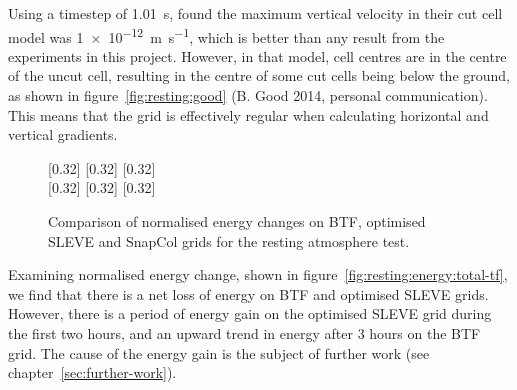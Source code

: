 Using a timestep of \SI{1.01}{\second}, \textcite{good2013} found the maximum vertical velocity in their cut cell model was \SI{1e-12}{\meter\per\second}, which is better than any result from the experiments in this project.  However, in that model, cell centres are in the centre of the uncut cell, resulting in the centre of some cut cells being below the ground, as shown in figure~\ref{fig:resting:good} (B. Good 2014, personal communication).  This means that the grid is effectively regular when calculating horizontal and vertical gradients.

\begin{figure}
	\captionsetup[subfigure]{position=b}
	\centering
	[0.32\textwidth]{}
	\hfill
	[0.32\textwidth]{}
	\hfill
	[0.32\textwidth]{}
	\\
	[0.32\textwidth]{}
	\hfill
	[0.32\textwidth]{}
	\hfill
	[0.32\textwidth]{}
	\caption{Comparison of normalised energy changes on BTF, optimised SLEVE and SnapCol grids for the resting atmosphere test.}
	\label{fig:resting:energy}
\end{figure}

Examining normalised energy change, shown in figure~\ref{fig:resting:energy:total-tf}, we find that there is a net loss of energy on BTF and optimised SLEVE grids.  However, there is a period of energy gain on the optimised SLEVE grid during the first two hours, and an upward trend in energy after 3 hours on the BTF grid.  The cause of the energy gain is the subject of further work (see chapter~\ref{sec:further-work}).

